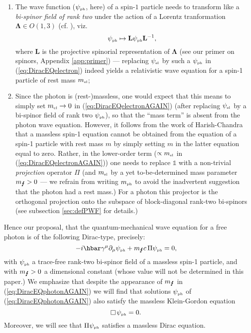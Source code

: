 \documentclass[12pt]{article}
\theoremstyle{definition}
\newcommand{\refeq}[1]{(\ref{#1})}
\numberwithin{equation}{section}
\newcommand{\bL}{\mathbf{L}}
\newcommand{\beq}{\begin{equation}}
\newcommand{\eeq}{\end{equation}}
\newcommand{\Id}{\mathds{1}}
\newcommand{\bLa}{\boldsymbol{\Lambda}}
\newcommand{\psiPH}{{\psi_{\mbox{\rm\tiny ph}}}}
\newcommand{\psiEL}{{\psi_{\mbox{\rm\tiny el}}}}
\newcommand{\mEL}{{m_{\mbox{\rm\tiny el}}}}
\newcommand{\mPHO}{{m_{\mbox{\rm\tiny ph}}}}
\newcommand{\mPH}{{m_{\mbox{\Lightning}}}}
\newcommand{\ga}{\gamma}
\newcommand{\ben}{\begin{enumerate}}
\newcommand{\een}{\end{enumerate}}
\newcommand{\dal}{\raisebox{3pt}{\fbox{}}\,}
\begin{document}
\ben

\item 
{The wave function ($\psiPH$, here) of a spin-$1$ particle needs to transform like a {\em bi-spinor field of rank two}
under the action of a Lorentz tranformation $\bLa \in O(1,3)$ (cf. \cite{PenroseRindlerBOOK}), viz.
\beq 
\psiPH \mapsto \bL \psiPH \bL^{-1},
\eeq
where $\bL$ is the projective spinorial representation of $\bLa$ (see our primer on spinors, Appendix \ref{app:primer}) 
--- replacing $\psiEL$ by
such a $\psiPH$ in  \refeq{eq:DiracEQelectron} indeed yields a relativistic wave equation for a spin-1 particle of rest mass $\mEL$;}

\item
{Since the photon is (rest-)massless, one would expect that this means to simply set $\mEL\to 0$ 
in \refeq{eq:DiracEQelectronAGAIN} (after replacing $\psiEL$ by a {bi-spinor field of rank two} $\psiPH$),
so that the ``mass term'' is absent from the photon wave equation.
 However, it follows from the work of Harish-Chandra \cite{HC1946} that a massless spin-1 equation cannot be obtained 
from the equation of a  spin-1 particle with rest mass $m$ by simply setting $m$ in the latter equation equal to zero. 
 Rather, in the lower-order term ($\propto \mEL$ in \refeq{eq:DiracEQelectronAGAIN}) one
needs to replace $\Id$ with a non-trivial \emph{projection} operator $\Pi$ (and $\mEL$ by a yet to-be-determined mass parameter $\mPH>0$ ---
we refrain from writing $\mPHO$ to avoid the inadvertent suggestion that the photon had a rest mass.)
 For a photon this projector is the orthogonal projection onto the subspace of block-diagonal rank-two bi-spinors (see subsection 
\ref{sec:defPWF} for  details.)}

\een

\noindent
 Hence our proposal, that the quantum-mechanical wave equation for a free photon is of the following Dirac-type,
precisely:
\beq \label{eq:DiracEQphotonAGAIN} 
{-i\hbar \ga^\mu \partial_\mu \psiPH  + \mPH c\,\Pi \psiPH= 0},
\eeq
with $\psiPH$ a trace-free rank-two bi-spinor field of a massless spin-1 particle, and with $\mPH>0$ a dimensional constant (whose value will not be determined in this paper.)
 We emphasize that despite the appearance of $\mPH$ in (\ref{eq:DiracEQphotonAGAIN}) we will find
that solutions $\psiPH$ of \refeq{eq:DiracEQphotonAGAIN} also satisfy the massless Klein-Gordon equation 
\beq \label{eq:masslessKGeq}
\dal\psiPH=0.
\eeq
 Moreover, we will see that $\Pi\psiPH$ satisfies a massless Dirac equation. 
\end{document}
